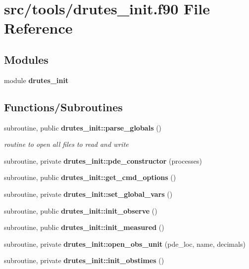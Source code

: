 \section{src/tools/drutes\+\_\+init.f90 File Reference}
\label{drutes__init_8f90}
\subsection*{Modules}
\begin{DoxyCompactItemize}
\item 
module {\bf drutes\+\_\+init}
\end{DoxyCompactItemize}
\subsection*{Functions/\+Subroutines}
\begin{DoxyCompactItemize}
\item 
subroutine, public {\bf drutes\+\_\+init\+::parse\+\_\+globals} ()
\begin{DoxyCompactList}\small\item\em routine to open all files to read and write \end{DoxyCompactList}\item 
subroutine, private {\bf drutes\+\_\+init\+::pde\+\_\+constructor} (processes)
\item 
subroutine, public {\bf drutes\+\_\+init\+::get\+\_\+cmd\+\_\+options} ()
\item 
subroutine, private {\bf drutes\+\_\+init\+::set\+\_\+global\+\_\+vars} ()
\item 
subroutine, public {\bf drutes\+\_\+init\+::init\+\_\+observe} ()
\item 
subroutine, public {\bf drutes\+\_\+init\+::init\+\_\+measured} ()
\item 
subroutine, private {\bf drutes\+\_\+init\+::open\+\_\+obs\+\_\+unit} (pde\+\_\+loc, name, decimals)
\item 
subroutine, private {\bf drutes\+\_\+init\+::init\+\_\+obstimes} ()
\end{DoxyCompactItemize}
